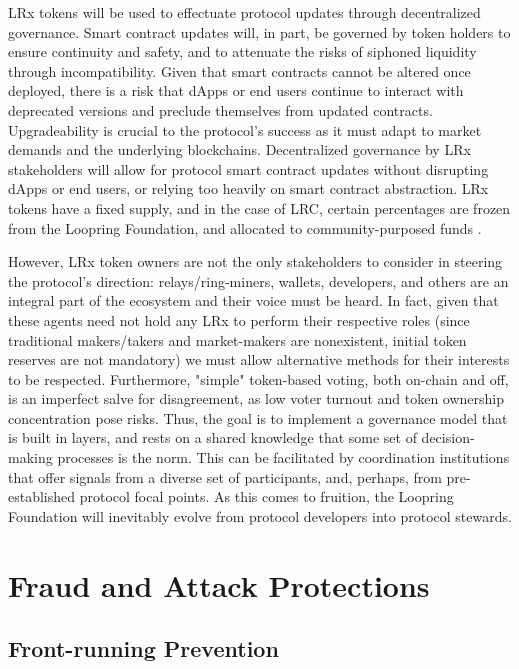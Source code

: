 \documentclass[UTF8,nofonts]{article}
\begin{document}
\begin{multicols}{2}
LRx tokens will be used to effectuate protocol updates through decentralized governance. Smart contract updates will, in part, be governed by token holders to ensure continuity and safety, and to attenuate the risks of siphoned liquidity through incompatibility. Given that smart contracts cannot be altered once deployed, there is a risk that dApps or end users continue to interact with deprecated versions and preclude themselves from updated contracts. Upgradeability is crucial to the protocol's success as it must adapt to market demands and the underlying blockchains. Decentralized governance by LRx stakeholders will allow for protocol smart contract updates without disrupting dApps or end users, or relying too heavily on smart contract abstraction. LRx tokens have a fixed supply, and in the case of LRC, certain percentages are frozen from the Loopring Foundation, and allocated to community-purposed funds \cite{LRCtokendoc}.

However, LRx token owners are not the only stakeholders to consider in steering the protocol's direction: relays/ring-miners, wallets, developers, and others are an integral part of the ecosystem and their voice must be heard. In fact, given that these agents need not hold any LRx to perform their respective roles (since traditional makers/takers and market-makers are nonexistent, initial token reserves are not mandatory) we must allow alternative methods for their interests to be respected. Furthermore, "simple" token-based voting, both on-chain and off, is an imperfect salve for disagreement, as low voter turnout and token ownership concentration pose risks. Thus, the goal is to implement a governance model that is built in layers, and rests on a shared knowledge that some set of decision-making processes is the norm. This can be facilitated by coordination institutions that offer signals from a diverse set of participants, and, perhaps, from pre-established protocol focal points. As this comes to fruition, the Loopring Foundation will inevitably evolve from protocol developers into protocol stewards.

\section{Fraud and Attack Protections}

\subsection{Front-running Prevention\label{sec:dual_authoring}}


\end{multicols}
\end{document}
